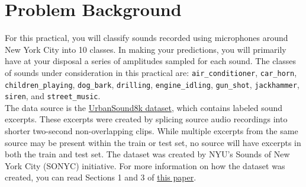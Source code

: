 \documentclass[12pt]{article}
\begin{document}
\section{Problem Background}\label{section:problem-background}
For this practical, you will classify sounds recorded using microphones around New York City into 10 classes. In making your predictions, you will primarily have at your disposal a series of amplitudes sampled for each sound. The classes of sounds under consideration in this practical are: \texttt{air\_conditioner}, \texttt{car\_horn}, \texttt{children\_playing}, \texttt{dog\_bark}, \texttt{drilling}, \texttt{engine\_idling}, \texttt{gun\_shot}, \texttt{jackhammer}, \texttt{siren}, and \texttt{street\_music}.\\ 

\noindent The data source is the \href{https://urbansounddataset.weebly.com/urbansound8k.html}{UrbanSound8k dataset}, which contains labeled sound excerpts. These excerpts were created by splicing source audio recordings into shorter two-second non-overlapping clips. While multiple excerpts from the same source may be present within the train or test set, no source will have excerpts in both the train and test set.  The dataset was created by NYU's Sounds of New York City (SONYC) initiative.  For more information on how the dataset was created, you can read Sections 1 and 3 of \href{http://www.justinsalamon.com/uploads/4/3/9/4/4394963/salamon_urbansound_acmmm14.pdf}{this paper}.  
\end{document}
